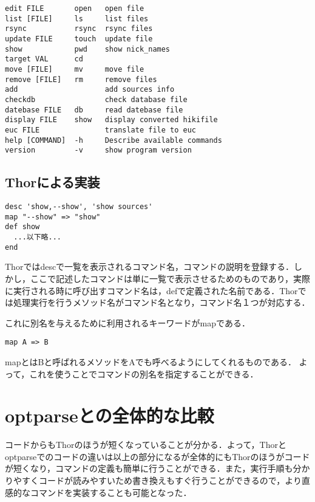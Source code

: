 \documentclass[a4j,twocolumn]{jsarticle}
\begin{document}
\begin{verbatim}
edit FILE       open   open file
list [FILE]     ls     list files
rsync           rsync  rsync files
update FILE     touch  update file
show            pwd    show nick_names
target VAL      cd     
move [FILE]     mv     move file
remove [FILE]   rm     remove files
add                    add sources info
checkdb                check database file
datebase FILE   db     read datebase file
display FILE    show   display converted hikifile
euc FILE               translate file to euc
help [COMMAND]  -h     Describe available commands
version         -v     show program version
\end{verbatim}

\subsection{Thorによる実装}
\begin{verbatim}
desc 'show,--show', 'show sources'
map "--show" => "show"
def show
  ...以下略...
end
\end{verbatim}
Thorではdescで一覧を表示されるコマンド名，コマンドの説明を登録する．しかし，ここで記述したコマンドは単に一覧で表示させるためのものであり，実際に実行される時に呼び出すコマンド名は，defで定義された名前である．Thorでは処理実行を行うメソッド名がコマンド名となり，コマンド名１つが対応する．

これに別名を与えるために利用されるキーワードがmapである．
\begin{verbatim}
map A => B
\end{verbatim}
mapとはBと呼ばれるメソッドをAでも呼べるようにしてくれるものである．
よって，これを使うことでコマンドの別名を指定することができる．

\section{optparseとの全体的な比較}
コードからもThorのほうが短くなっていることが分かる．よって，Thorとoptparseでのコードの違いは以上の部分になるが全体的にもThorのほうがコードが短くなり，コマンドの定義も簡単に行うことができる．また，実行手順も分かりやすくコードが読みやすいため書き換えもすぐ行うことができるので，より直感的なコマンドを実装することも可能となった．
\end{document}
